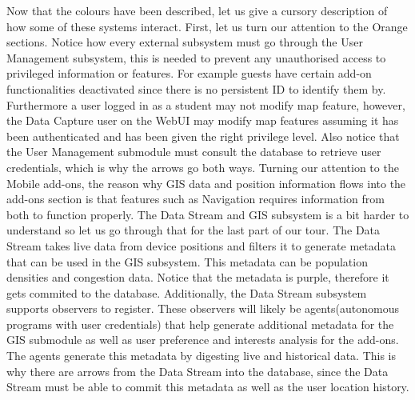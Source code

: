 Now that the colours have been described, let us give a cursory description of how some of these systems interact. First, let us  turn our attention to the Orange sections. Notice how every external subsystem must go through the User Management subsystem, this is needed to prevent any unauthorised access to privileged information or features. For example guests have certain add-on functionalities deactivated since there is no persistent ID to identify them by. Furthermore a user logged in as a student may not modify map feature, however, the Data Capture user on the WebUI may modify map features assuming it has been authenticated and has been given the right privilege level. Also notice that the User Management submodule must consult the database to retrieve user credentials, which is why the arrows go both ways. Turning our attention to the Mobile add-ons, the reason why GIS data and position information flows into the add-ons section is that features such as Navigation requires information from both to function properly. The Data Stream and GIS subsystem is a bit harder to understand so let us go through that for the last part of our tour. The Data Stream takes live data from device positions and filters it to generate metadata that can be used in the GIS subsystem. This metadata can be population densities and congestion data. Notice that the metadata is purple, therefore it gets commited to the database. Additionally, the Data Stream subsystem supports observers to register. These observers will likely be agents(autonomous programs with user credentials) that help generate additional metadata for the GIS submodule as well as user preference and interests analysis for the add-ons. The agents generate this metadata by digesting live and historical data. This is why there are arrows from the Data Stream into the database, since the Data Stream must be able to commit this metadata as well as the user location history.
